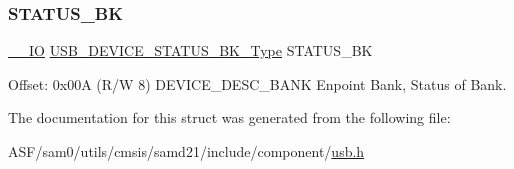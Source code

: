 \subsubsection{\texorpdfstring{STATUS\_BK}{STATUS\_BK}}
{\footnotesize\ttfamily \mbox{\hyperlink{core__cm0plus_8h_aec43007d9998a0a0e01faede4133d6be}{\+\_\+\+\_\+\+IO}} \mbox{\hyperlink{union_u_s_b___d_e_v_i_c_e___s_t_a_t_u_s___b_k___type}{U\+S\+B\+\_\+\+D\+E\+V\+I\+C\+E\+\_\+\+S\+T\+A\+T\+U\+S\+\_\+\+B\+K\+\_\+\+Type}} S\+T\+A\+T\+U\+S\+\_\+\+BK}



Offset\+: 0x00A (R/W 8) D\+E\+V\+I\+C\+E\+\_\+\+D\+E\+S\+C\+\_\+\+B\+A\+NK Enpoint Bank, Status of Bank. 



The documentation for this struct was generated from the following file\+:\begin{DoxyCompactItemize}
\item 
A\+S\+F/sam0/utils/cmsis/samd21/include/component/\mbox{\hyperlink{component_2usb_8h}{usb.\+h}}\end{DoxyCompactItemize}
